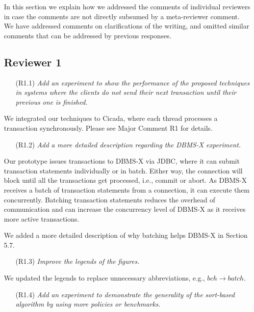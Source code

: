 \documentclass{article}
\newcommand{\changed}[1]{#1}
\newcommand{\changed}[1]{{\color{blue}#1}}
\begin{document}
In this section we explain how we addressed the comments of individual reviewers in case the comments are not directly subsumed by a meta-reviewer comment. We have addressed comments on clarifications of the writing, and omitted similar comments that can be addressed by previous responses.

\subsection{Reviewer 1}

\begin{itemize}
\item[(R1.1)] \emph{Add an experiment to show the performance of the proposed techniques in systems where the clients do not send their next transaction until their previous one is finished.}
\end{itemize}
\changed{
	We integrated our techniques to Cicada, where each thread processes a transaction synchronously. Please see Major Comment R1 for details.
}

\begin{itemize}
\item[(R1.2)] \emph{Add a more detailed description regarding the DBMS-X experiment.}
\end{itemize}

\changed{
	Our prototype issues transactions to DBMS-X via JDBC, where it can submit transaction statements individually or in batch. Either way, the connection will block until all the transactions get processed, i.e., commit or abort. As DBMS-X receives a batch of transaction statements from a connection, it can execute them concurrently. Batching transaction statements reduces the overhead of communication and can increase the concurrency level of DBMS-X as it receives more active transactions.
	
	We added a more detailed description of why batching helps DBMS-X in Section 5.7.
}

\begin{itemize}
\item[(R1.3)] \emph{Improve the legends of the figures.}
\end{itemize}

\changed{
	We updated the legends to replace unnecessary abbreviations, e.g., $bch \to batch$.
}

\begin{itemize}
\item[(R1.4)] \emph{Add an experiment to demonstrate the generality of the sort-based algorithm by using more policies or benchmarks.}
\end{itemize}
\end{document}
